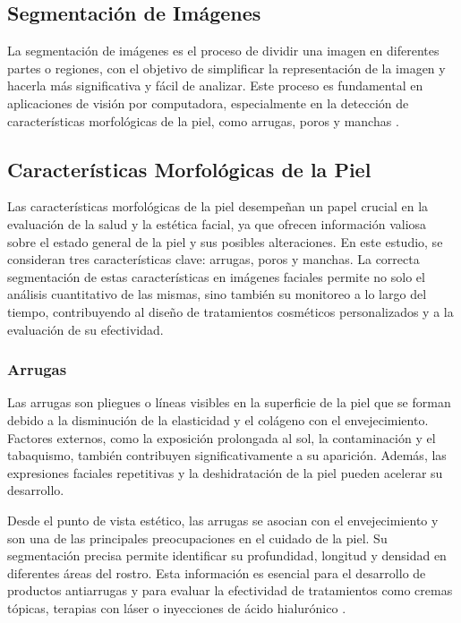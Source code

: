 \subsection{Segmentación de Imágenes}
La segmentación de imágenes es el proceso de dividir una imagen en diferentes partes o regiones, con el objetivo de simplificar la representación de la imagen y hacerla más significativa y fácil de analizar. Este proceso es fundamental en aplicaciones de visión por computadora, especialmente en la detección de características morfológicas de la piel, como arrugas, poros y manchas \cite{autor2020segmentacion}.

\subsection{Características Morfológicas de la Piel}
Las características morfológicas de la piel desempeñan un papel crucial en la evaluación de la salud y la estética facial, ya que ofrecen información valiosa sobre el estado general de la piel y sus posibles alteraciones. En este estudio, se consideran tres características clave: arrugas, poros y manchas. La correcta segmentación de estas características en imágenes faciales permite no solo el análisis cuantitativo de las mismas, sino también su monitoreo a lo largo del tiempo, contribuyendo al diseño de tratamientos cosméticos personalizados y a la evaluación de su efectividad.

\subsubsection{Arrugas}
Las arrugas son pliegues o líneas visibles en la superficie de la piel que se forman debido a la disminución de la elasticidad y el colágeno con el envejecimiento. Factores externos, como la exposición prolongada al sol, la contaminación y el tabaquismo, también contribuyen significativamente a su aparición. Además, las expresiones faciales repetitivas y la deshidratación de la piel pueden acelerar su desarrollo.

Desde el punto de vista estético, las arrugas se asocian con el envejecimiento y son una de las principales preocupaciones en el cuidado de la piel. Su segmentación precisa permite identificar su profundidad, longitud y densidad en diferentes áreas del rostro. Esta información es esencial para el desarrollo de productos antiarrugas y para evaluar la efectividad de tratamientos como cremas tópicas, terapias con láser o inyecciones de ácido hialurónico \cite{autor2021arrugas}.

